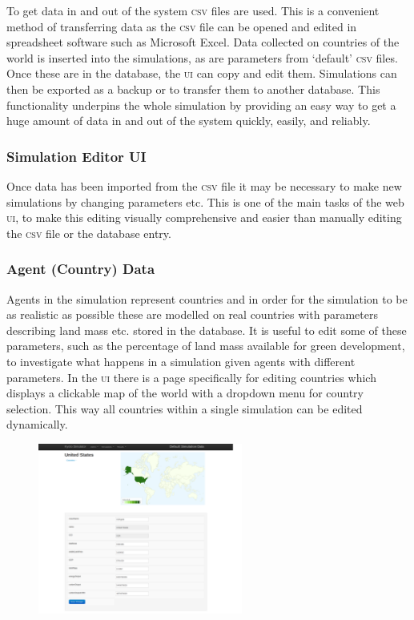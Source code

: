 To get data in and out of the system \textsc{csv} files are used. This is a convenient method of transferring data as the \textsc{csv} file can be opened and edited in spreadsheet software such as Microsoft Excel. Data collected on countries of the world is inserted into the simulations, as are parameters from `default' \textsc{csv} files. Once these are in the database, the \textsc{ui} can copy and edit them. Simulations can then be exported as a backup or to transfer them to another database. This functionality underpins the whole simulation by providing an easy way to get a huge amount of data in and out of the system quickly, easily, and reliably.

\subsubsection{Simulation Editor UI}

Once data has been imported from the \textsc{csv} file it may be necessary to make new simulations by changing parameters etc. This is one of the main tasks of the web \textsc{ui}, to make this editing visually comprehensive and easier than manually editing the \textsc{csv} file or the database entry.

\subsubsection{Agent (Country) Data}

Agents in the simulation represent countries and in order for the simulation to be as realistic as possible these are modelled on real countries with parameters describing land mass etc. stored in the database. It is useful to edit some of these parameters, such as the percentage of land mass available for green development, to investigate what happens in a simulation given agents with different parameters. In the \textsc{ui} there is a page specifically for editing countries which displays a clickable map of the world with a dropdown menu for country selection. This way all countries within a single simulation can be edited dynamically.

\begin{figure}[h!]
	\centering
	\includegraphics[width=0.6\textwidth]{img/ui1.png}
	\caption{}
\end{figure}

